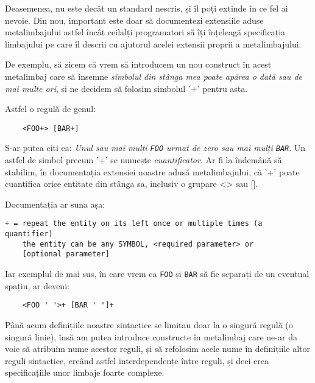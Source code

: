 Deasemenea, nu este decât un standard nescris, și îl poți
extinde în ce fel ai nevoie. Din nou, important este doar
să documentezi {\glqq}extensiile{\grqq} aduse metalimbajului astfel
încât ceilalți programatori să îți înțeleagă specificația
limbajului pe care îl descrii cu ajutorul acelei
extensii proprii a metalimbajului.

De exemplu, să zicem că vrem să introducem un nou
construct în acest metalimbaj care să însemne \textit{simbolul
din stânga mea poate apărea o dată sau de mai multe ori}, și
ne decidem să folosim simbolul '+' pentru asta.

Astfel o regulă de genul:
\begin{verbatim}
	<FOO+> [BAR+]
\end{verbatim}
S-ar putea citi ca: \textit{Unul sau mai mulți \texttt{FOO} urmat de zero sau mai
mulți \texttt{BAR}}. Un astfel de simbol precum '+' se numește \textsl{cuantificator}.
Ar fi la îndemână să stabilim, în documentația extensiei noastre adusă metalimbajului,
că '+' poate cuantifica orice entitate din stânga sa, inclusiv o grupare <> sau [].

Documentația ar suna așa:
\begin{verbatim}
+ = repeat the entity on its left once or multiple times (a quantifier)
    the entity can be any SYMBOL, <required parameter> or
	[optional parameter]
\end{verbatim}
Iar exemplul de mai sus, în care vrem ca \texttt{FOO} și \texttt{BAR}
să fie separați de un eventual spațiu, ar deveni:
\begin{verbatim}
	<FOO ' '>+ [BAR ' ']+
\end{verbatim}

Până acum definițiile noastre sintactice se limitau doar la
o singură regulă (o singură linie), însă am putea introduce
constructe în metalimbaj care ne-ar da voie să atribuim nume
acestor reguli, și să refolosim acele nume în definițiile altor
reguli sintactice, creând astfel interdependențe între reguli,
și deci crea specificațiile unor limbaje foarte complexe.


